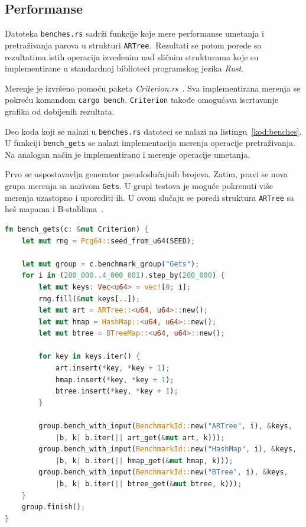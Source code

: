 \documentclass[12pt,oneside]{memoir}
\begin{document}
\subsection{Performanse}
Datoteka \texttt{benches.rs} sadrži funkcije koje mere
performanse umetanja i pretraživanja parova u
strukturi \texttt{ARTree}.\
Rezultati se potom porede sa rezultatima istih operacija
izvedenim nad sličnim strukturama koje su implementirane u standardnoj
biblioteci programskog jezika \textit{Rust}.

Merenje je izvršeno pomoću paketa \textit{Criterion.rs}~\cite{criterion}.
Sva implementirana merenja se pokreću komandom \texttt{cargo bench}.
\texttt{Criterion} takođe
omogućava iscrtavanje grafika od dobijenih rezultata.

Deo koda koji se nalazi u \texttt{benches.rs} datoteci se nalazi na
listingu~\ref{kod:benches}. U funkciji \texttt{bench\_gets} se nalazi
implementacija merenja operacije pretraživanja.
Na analogan način je implementirano i merenje operacije umetanja.

Prvo se uspostavavlja generator pseudoslučajnih brojeva. Zatim,
pravi se nova grupa merenja sa nazivom \texttt{Gets}. U grupi testova
je moguće pokrenuti više merenja uzastopno i uporediti ih.
U ovom slučaju se poredi struktura \texttt{ARTree} sa heš mapama i
B-stablima~\cite{btree}.

\begin{lstlisting}[language=Rust,
                   caption={Funkcija \texttt{bench\_gets}},
                   label={kod:benches}]
fn bench_gets(c: &mut Criterion) {
    let mut rng = Pcg64::seed_from_u64(SEED);

    let mut group = c.benchmark_group("Gets");
    for i in (200_000..4_000_001).step_by(200_000) {
        let mut keys: Vec<u64> = vec![0; i];
        rng.fill(&mut keys[..]);
        let mut art = ARTree::<u64, u64>::new();
        let mut hmap = HashMap::<u64, u64>::new();
        let mut btree = BTreeMap::<u64, u64>::new();

        for key in keys.iter() {
            art.insert(*key, *key + 1);
            hmap.insert(*key, *key + 1);
            btree.insert(*key, *key + 1);
        }

        group.bench_with_input(BenchmarkId::new("ARTree", i), &keys,
            |b, k| b.iter(|| art_get(&mut art, k)));
        group.bench_with_input(BenchmarkId::new("HashMap", i), &keys,
            |b, k| b.iter(|| hmap_get(&mut hmap, k)));
        group.bench_with_input(BenchmarkId::new("BTree", i), &keys,
            |b, k| b.iter(|| btree_get(&mut btree, k)));
    }
    group.finish();
}

\end{lstlisting}
\end{document}
